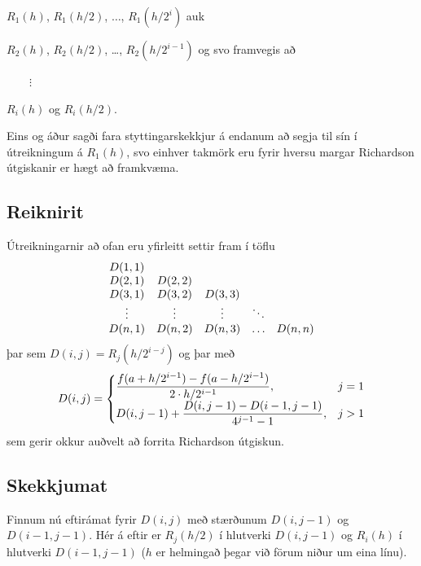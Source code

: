 \documentclass[A4paper,10pt,icelandic]{sphinxmanual}
\begin{document}
\begin{DUlineblock}{0em}
\item[] \(R_1(h)\), \(R_1(h/2)\), \(\ldots\), \(R_1(h/2^i)\)
auk
\item[] \(R_2(h)\), \(R_2(h/2)\), …, \(R_2(h/2^{i-1})\) og svo
framvegis að
\item[] \(\qquad \vdots\)
\item[] \(R_i(h)\) og \(R_i(h/2)\).
\end{DUlineblock}

Eins og áður sagði fara styttingarskekkjur á endanum að segja til sín í
útreikningum á \(R_1(h)\), svo einhver takmörk eru fyrir hversu
margar Richardson útgiskanir er hægt að framkvæma.


\subsection{Reiknirit}
\label{kafli04:reiknirit}
Útreikningarnir að ofan eru yfirleitt settir fram í töflu
\begin{gather}
\begin{split}\begin{array}{ccccc}
    D(1,1) &   &   &   &   \\
    D(2,1) & D(2,2) &  &  &  \\
    D(3,1) & D(3,2) & D(3,3) & & \\
    \vdots & \vdots & \vdots & \ddots & \\
    D(n,1) & D(n,2) & D(n,3) & \ldots & D(n,n)
  \end{array}\end{split}\notag
\end{gather}
þar sem \(D(i,j) = R_j(h/2^{i-j})\) og þar með
\begin{gather}
\begin{split}D(i,j) = \begin{cases}
    \dfrac{f(a+h/2^{i-1})-f(a-h/2^{i-1})}{2\cdot h/2^{i-1}}, & j = 1 \\
    D(i,j-1) + \dfrac{D(i,j-1)-D(i-1,j-1)}{4^{j-1}-1}, & j > 1
  \end{cases}\end{split}\notag
\end{gather}
sem gerir okkur auðvelt að forrita Richardson útgiskun.


\subsection{Skekkjumat}
\label{kafli04:id5}
Finnum nú eftirámat fyrir \(D(i,j)\) með stærðunum
\(D(i,j-1)\) og \(D(i-1,j-1)\). Hér á eftir er
\(R_j(h/2)\) í hlutverki \(D(i,j-1)\) og \(R_i(h)\) í
hlutverki \(D(i-1,j-1)\)
(\(h\) er helmingað þegar við förum niður um eina línu).
\end{document}

